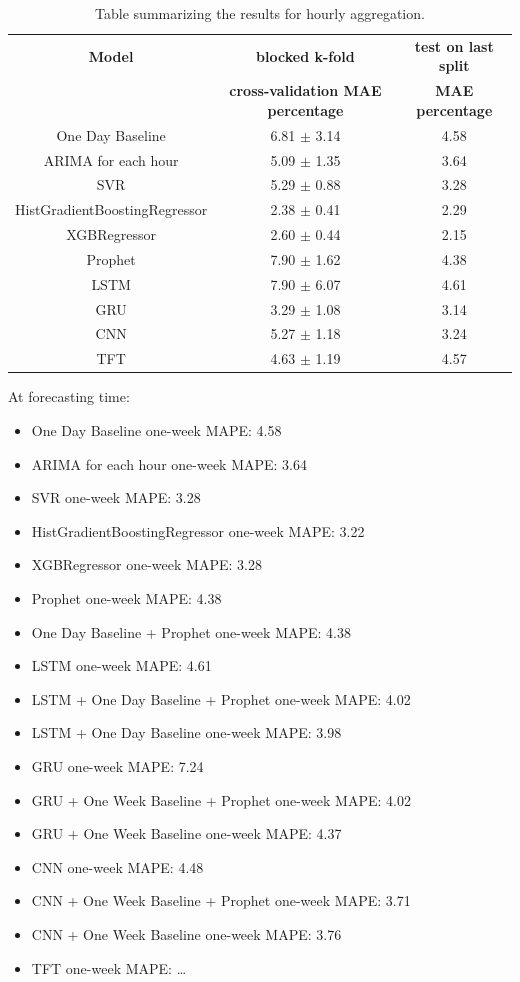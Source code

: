 \begin{table}[H]
\centering
\begin{tabular}{|c|c|c|}
\hline
\textbf{Model} & \textbf{blocked k-fold} & \textbf{test on last split}\\
 & \textbf{cross-validation MAE percentage} & \textbf{MAE percentage}\\
\hline
One Day Baseline & 6.81 $\pm$ 3.14 & 4.58\\
\hline
ARIMA for each hour & 5.09 $\pm$ 1.35 & 3.64\\
\hline
SVR & 5.29 $\pm$ 0.88 & 3.28\\
\hline
HistGradientBoostingRegressor & 2.38 $\pm$ 0.41 & 2.29\\
\hline
XGBRegressor & 2.60 $\pm$ 0.44 & 2.15\\
\hline
Prophet & 7.90 $\pm$ 1.62 & 4.38\\
\hline
LSTM & 7.90 $\pm$ 6.07 & 4.61\\
\hline
GRU & 3.29 $\pm$ 1.08 & 3.14\\
\hline
CNN & 5.27 $\pm$ 1.18 & 3.24\\
\hline
TFT & 4.63 $\pm$ 1.19 & 4.57\\
\hline
\end{tabular}
\caption{Table summarizing the results for hourly aggregation.}
\label{tab:productionhourlyresults}
\end{table}


At forecasting time:
\begin{itemize}
  \item One Day Baseline one-week MAPE: 4.58
  \item ARIMA for each hour one-week MAPE: 3.64
  \item SVR one-week MAPE: 3.28
  \item HistGradientBoostingRegressor one-week MAPE: 3.22
  \item XGBRegressor one-week MAPE: 3.28
  \item Prophet one-week MAPE: 4.38
  \item One Day Baseline + Prophet one-week MAPE: 4.38
  \item LSTM one-week MAPE: 4.61
  \item LSTM + One Day Baseline + Prophet one-week MAPE: 4.02
  \item LSTM + One Day Baseline one-week MAPE: 3.98
  \item GRU one-week MAPE: 7.24
  \item GRU + One Week Baseline + Prophet one-week MAPE: 4.02
  \item GRU + One Week Baseline one-week MAPE: 4.37
  \item CNN one-week MAPE: 4.48
  \item CNN + One Week Baseline + Prophet one-week MAPE: 3.71
  \item CNN + One Week Baseline one-week MAPE: 3.76
  \item TFT one-week MAPE: …
\end{itemize}

